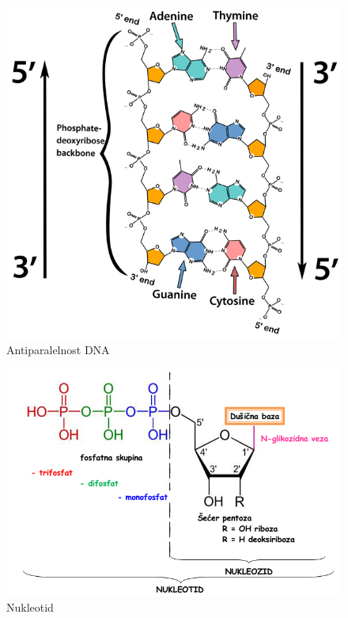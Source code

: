 \documentclass[a4paper,oneside,12pt]{memoir} %
\begin{document}
\begin{spacing}{1.5}
\begin{figure}[h!t]
\centering \includegraphics[scale=1]{antipar.jpg}
\caption{Antiparalelnost DNA}
\label{fig:antipar}
\end{figure} 


\begin{figure}[h!t]
\centering \includegraphics[scale=0.5]{Nukleotid.png}
\caption{Nukleotid}
\label{fig:Nukleotid}
\end{figure} 

\newpage

\end{spacing}
\end{document}
